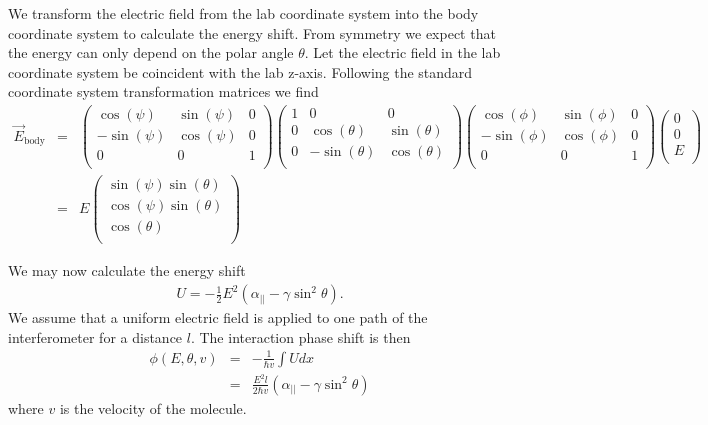 We transform the electric field from the lab coordinate system into the body coordinate system to calculate the energy shift. From symmetry we expect that the energy can only depend on the polar angle $\theta$. Let the electric field in the lab coordinate system be coincident with the lab z-axis. Following the standard coordinate system transformation matrices \cite{Gol02} we find
\begin{eqnarray}
\vec{E}_\textrm{body} &=& 
	\begin{pmatrix}
		\cos(\psi)		&	\sin(\psi)		&		0		\\
		-\sin(\psi)		&	\cos(\psi)		&		0		\\
			0		&		0		&		1		\\
	\end{pmatrix}
	\begin{pmatrix}
			1		&		0		&		0		\\
			0		&	\cos(\theta)	&	\sin(\theta)	\\
			0		&	-\sin(\theta)	&	\cos(\theta)	\\
	\end{pmatrix}
	\begin{pmatrix}
		\cos(\phi)		&	\sin(\phi)		&		0		\\
		-\sin(\phi)		&	\cos(\phi)		&		0		\\
			0		&		0		&		1		\\
	\end{pmatrix}
	\begin{pmatrix}
			0	\\
			0	\\
			E	\\
	\end{pmatrix}
	\nonumber \\
	&=& E
	\begin{pmatrix}
			\sin(\psi)\sin(\theta)	\\
			\cos(\psi)\sin(\theta)	\\
			\cos(\theta)	\\
	\end{pmatrix}
\end{eqnarray}
 

We may now calculate the energy shift
\begin{eqnarray}
U = -\frac{1}{2}E^2\left(\alpha_{||}-\gamma\sin^2\theta \right).
\end{eqnarray}
We assume that a uniform electric field is applied to one path of the interferometer for a distance $l$. The interaction phase shift is then
\begin{eqnarray}
\phi(E,\theta,v) 	&=& -\frac{1}{\hbar v} \int U dx  \nonumber \\
			&=& \frac{E^2 l}{2\hbar v}\left(\alpha_{||}-\gamma\sin^2\theta \right)
\end{eqnarray}
where $v$ is the velocity of the molecule.

